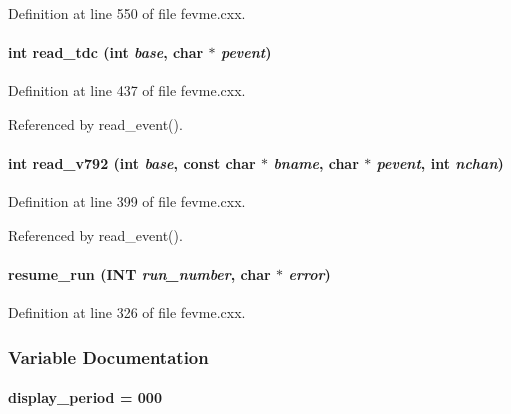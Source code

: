 Definition at line 550 of file fevme.cxx.
\paragraph[{read\_\-tdc}]{\setlength{\rightskip}{0pt plus 5cm}int read\_\-tdc (int {\em base}, \/  char $\ast$ {\em pevent})}\hfill\label{fevme_8cxx_acc5905ff1ba3844f3f5ea65c01cadfd1}


Definition at line 437 of file fevme.cxx.

Referenced by read\_\-event().
\paragraph[{read\_\-v792}]{\setlength{\rightskip}{0pt plus 5cm}int read\_\-v792 (int {\em base}, \/  const char $\ast$ {\em bname}, \/  char $\ast$ {\em pevent}, \/  int {\em nchan})}\hfill\label{fevme_8cxx_a3edc404710f086af9a576ab24074b44a}


Definition at line 399 of file fevme.cxx.

Referenced by read\_\-event().
\paragraph[{resume\_\-run}]{ resume\_\-run ({\bf INT} {\em run\_\-number}, \/  char $\ast$ {\em error})}\hfill\label{fevme_8cxx_a6cada7e3f07b9fc2b9886263223661d4}


Definition at line 326 of file fevme.cxx.

\subsubsection{Variable Documentation}
\paragraph[{display\_\-period}]{ {\bf display\_\-period} = 000}\hfill\label{fevme_8cxx_ab9cdcefda91459091b0ed33011d0d18c}


